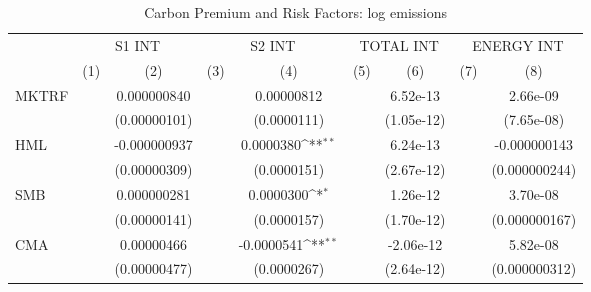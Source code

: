 \begin{table}[htbp]\centering
\def\sym#1{\ifmmode^{#1}\else\(^{#1}\)\fi}
\caption{Carbon Premium and Risk Factors: log emissions}
\begin{tabular}{l*{8}{c}}
\hline\hline
                    &\multicolumn{2}{c}{S1 INT}                 &\multicolumn{2}{c}{S2 INT}                 &\multicolumn{2}{c}{TOTAL INT}              &\multicolumn{2}{c}{ENERGY INT}             \\\cmidrule(lr){2-3}\cmidrule(lr){4-5}\cmidrule(lr){6-7}\cmidrule(lr){8-9}
                    &\multicolumn{1}{c}{(1)}         &\multicolumn{1}{c}{(2)}         &\multicolumn{1}{c}{(3)}         &\multicolumn{1}{c}{(4)}         &\multicolumn{1}{c}{(5)}         &\multicolumn{1}{c}{(6)}         &\multicolumn{1}{c}{(7)}         &\multicolumn{1}{c}{(8)}         \\
\hline
MKTRF               &                     & 0.000000840         &                     &  0.00000812         &                     &    6.52e-13         &                     &    2.66e-09         \\
                    &                     &(0.00000101)         &                     & (0.0000111)         &                     &  (1.05e-12)         &                     &  (7.65e-08)         \\
[1em]
HML                 &                     &-0.000000937         &                     &   0.0000380\sym{**} &                     &    6.24e-13         &                     &-0.000000143         \\
                    &                     &(0.00000309)         &                     & (0.0000151)         &                     &  (2.67e-12)         &                     &(0.000000244)         \\
[1em]
SMB                 &                     & 0.000000281         &                     &   0.0000300\sym{*}  &                     &    1.26e-12         &                     &    3.70e-08         \\
                    &                     &(0.00000141)         &                     & (0.0000157)         &                     &  (1.70e-12)         &                     &(0.000000167)         \\
[1em]
CMA                 &                     &  0.00000466         &                     &  -0.0000541\sym{**} &                     &   -2.06e-12         &                     &    5.82e-08         \\
                    &                     &(0.00000477)         &                     & (0.0000267)         &                     &  (2.64e-12)         &                     &(0.000000312)         \\

\end{tabular}
\end{table}
